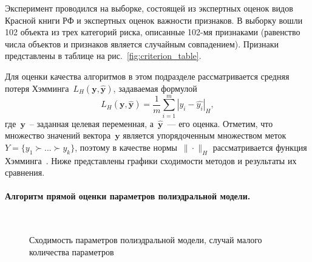 \documentclass{elsarticle}
\newcommand{\by}{\mathbf{y}}
\begin{document}
Эксперимент проводился на выборке, состоящей из экспертных оценок видов Красной книги РФ и экспертных оценок важности признаков. В выборку вошли 102 объекта из трех категорий риска, описанные 102-мя признаками (равенство числа объектов и признаков является случайным совпадением). Признаки представлены в таблице на рис.~\ref{fig:criterion_table}.

Для оценки качества алгоритмов в этом подразделе рассматривается средняя потеря Хэмминга~$L_H(\by,\hat{\by})$, задаваемая формулой
\begin{equation}
L_H(\by,\hat{\by})=\frac{1}{m}\sum\limits_{i=1}^m|y_i-\hat{y_i}|_H,
\label{eq:LossHamming}
\end{equation}
где~$\by$~-- заданная целевая переменная, а~$\hat{\by}$~--- его оценка. Отметим, что множество значений вектора~$\by$ является упорядоченным множеством меток~$Y=\{y_1\succ...\succ y_k\}$, поэтому в качестве нормы~$\|\cdot\|_H$ рассматривается функция Хэмминга~\cite{stenina2015ordinal}.
Ниже представлены графики сходимости методов и результаты их сравнения.

\paragraph{Алгоритм прямой оценки параметров полиэдральной модели.}
\begin{figure}
\begin{center}
 \\
\caption{Сходимость параметров полиэдральной модели, случай малого количества параметров}
\label{fig:ConesConvSmall}
\end{center}
\end{figure}
\end{document}
